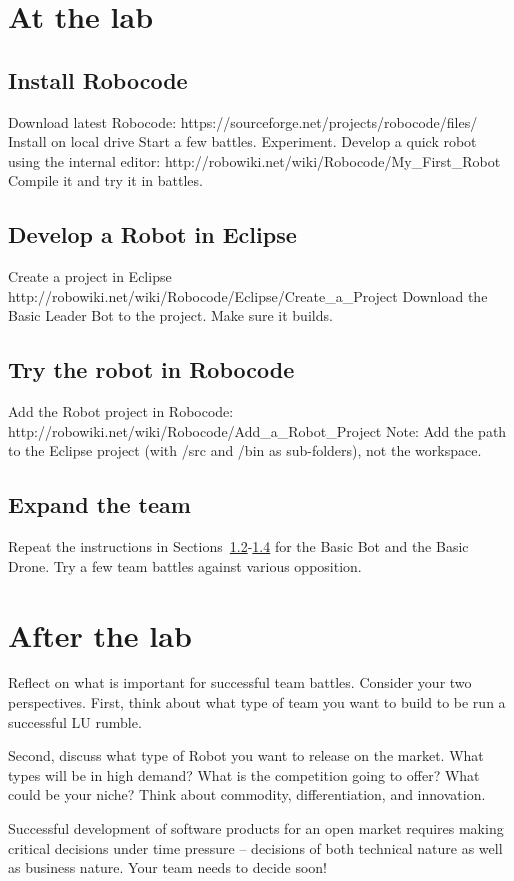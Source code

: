 \documentclass{scrreprt}
\begin{document}
\chapter{At the lab}

\section{Install Robocode}
Download latest Robocode: https://sourceforge.net/projects/robocode/files/
Install on local drive
Start a few battles. Experiment.
Develop a quick robot using the internal editor: http://robowiki.net/wiki/Robocode/My_First_Robot
Compile it and try it in battles.

\section{Develop a Robot in Eclipse} \label{sec:develop}
Create a project in Eclipse http://robowiki.net/wiki/Robocode/Eclipse/Create_a_Project
Download the Basic Leader Bot to the project. Make sure it builds.

\section{Try the robot in Robocode} \label{sec:try}
Add the Robot project in Robocode: http://robowiki.net/wiki/Robocode/Add_a_Robot_Project
Note: Add the path to the Eclipse project (with /src and /bin as sub-folders), not the workspace.

\section{Expand the team} \label{sec:expand}
Repeat the instructions in Sections~\ref{sec:develop}-\ref{sec:expand} for the Basic Bot and the Basic Drone. Try a few team battles against various opposition.

\chapter{After the lab}
Reflect on what is important for successful team battles. Consider your two perspectives. First, think about what type of team you want to build to be run a successful LU rumble.

Second, discuss what type of Robot you want to release on the market. What types will be in high demand? What is the competition going to offer? What could be your niche? Think about commodity, differentiation, and innovation.

Successful development of software products for an open market requires making critical decisions under time pressure -- decisions of both technical nature as well as business nature. Your team needs to decide soon!
\end{document}
